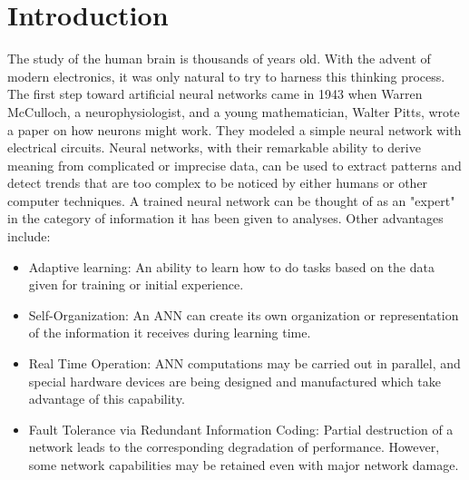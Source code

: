 \documentclass[12pt]{report}
\begin{document}
\section{Introduction}
The study of the human brain is thousands of years old. With the advent of modern electronics, it was only natural to try to harness this thinking process. The first step toward artificial neural networks came in 1943 when Warren McCulloch, a neurophysiologist, and a young mathematician, Walter Pitts, wrote a paper on how neurons might work. They modeled a simple neural network with electrical circuits. Neural networks, with their remarkable ability to derive meaning from complicated or imprecise data, can be used to extract patterns and detect trends that are too complex to be noticed by either humans or other computer techniques. A trained neural network can be thought of as an "expert" in the category of information it has been given to analyses. Other advantages include:
\begin{itemize}
	\item Adaptive learning: An ability to learn how to do tasks based on the data given for training or initial experience.
	\item Self-Organization: An ANN can create its own organization or representation of the information it receives during learning time.
	\item Real Time Operation: ANN computations may be carried out in parallel, and special hardware devices are being designed and manufactured which take advantage of this capability.
	\item Fault Tolerance via Redundant Information Coding: Partial destruction of a network leads to the corresponding degradation of performance. However, some network capabilities may be retained even with major network damage.
\end{itemize}
\end{document}
